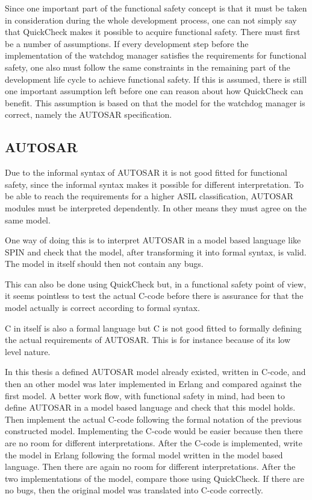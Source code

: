 Since one important part of the functional safety concept is that it
must be taken in consideration during the whole development process,
one can not simply say that QuickCheck makes it possible to acquire
functional safety. There must first be a number of assumptions. If
every development step before the implementation of the watchdog
manager satisfies the requirements for functional safety, one also
must follow the same constraints in the remaining part of the
development life cycle to achieve functional safety. If this is
assumed, there is still one important assumption left before one can
reason about how QuickCheck can benefit. This assumption is based on
that the model for the watchdog manager is correct, namely the AUTOSAR
specification.

\subsection{AUTOSAR}
Due to the informal syntax of AUTOSAR it is not good fitted for
functional safety, since the informal syntax makes it possible for
different interpretation. To be able to reach the requirements for a higher
ASIL classification, AUTOSAR modules must be interpreted dependently. In other
means they must agree on the same model.

One way of doing this is to interpret AUTOSAR in a model based
language like SPIN and check that the model, after transforming it
into formal syntax, is valid. The model in itself should then not
contain any bugs.

This can also be done using QuickCheck but, in a functional safety
point of view, it seems pointless to test the actual C-code before
there is assurance for that the model actually is correct according to
formal syntax.

C in itself is also a formal language but C is not good fitted to
formally defining the actual requirements of AUTOSAR. This is for
instance because of its low level nature.

In this thesis a defined AUTOSAR model already existed, written in
C-code, and then an other model was later implemented in Erlang and
compared against the first model. A better work flow, with functional
safety in mind, had been to define AUTOSAR in a model based language
and check that this model holds. Then implement the actual C-code
following the formal notation of the previous constructed
model. Implementing the C-code would be easier because then there are
no room for different interpretations. After the C-code is
implemented, write the model in Erlang following the formal model
written in the model based language. Then there are again no room for
different interpretations. After the two implementations of the model,
compare those using QuickCheck. If there are no bugs, then the
original model was translated into C-code correctly.

